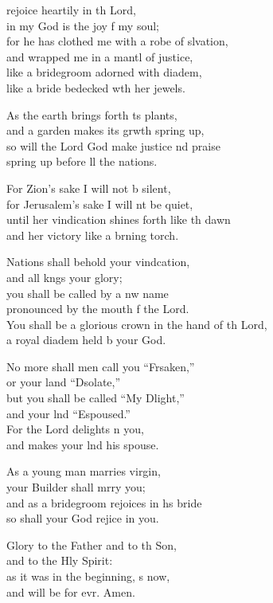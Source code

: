 \begin{psalmverse}
  \begin{patverse}
 rejoice heartily in th Lord,\Med\\
in my God is the joy f my soul;\\
for he has clothed me with a robe of slvation,\Med\\
and wrapped me in a mantl of justice,\\
like a bridegroom adorned with  diadem,\Med\\
like a bride bedecked w\pointup{\i}th her jewels.

As the earth brings forth \pointup{\i}ts plants,\Med\\
and a garden makes its grwth spring up,\\
so will the Lord God make justice nd praise\Med\\
spring up before ll the nations.

For Zion’s sake I will not b silent,\Med\\
for Jerusalem’s sake I will nt be quiet,\\
until her vindication shines forth like th dawn\Med\\
and her victory like a brning torch.

Nations shall behold your vind\pointup{\i}cation,\Med\\
and all k\pointup{\i}ngs your glory;\\
you shall be called by a nw name\Med\\
pronounced by the mouth f the Lord.\\
You shall be a glorious crown in the hand of th Lord,\Med\\
a royal diadem held b your God.

No more shall men call you “Frsaken,”\Med\\
or your land “Dsolate,”\\
but you shall be called “My Dlight,”\Med\\
and your lnd “Espoused.”\\
For the Lord delights \pointup{\i}n you,\Med\\
and makes your lnd his spouse.

As a young man marries  virgin,\Med\\
your Builder shall mrry you;\\
and as a bridegroom rejoices in h\pointup{\i}s bride\Med\\
so shall your God rejice in you.

Glory to the Father and to th Son,\Med\\
    and to the Hly Spirit:\\
as it was in the beginning, \pointup{\i}s now,\Med\\
    and will be for evr. Amen.
  \end{patverse}
\end{psalmverse}
